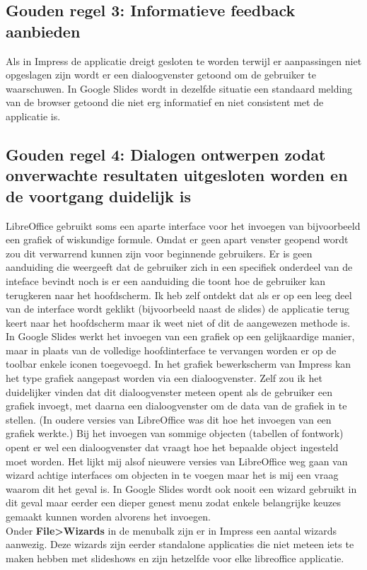 \documentclass[a4paper]{article}
\begin{document}
\subsection{Gouden regel 3: Informatieve feedback aanbieden}
Als in Impress de applicatie dreigt gesloten te worden terwijl er aanpassingen niet opgeslagen zijn wordt er een dialoogvenster getoond om de gebruiker te waarschuwen.
In Google Slides wordt in dezelfde situatie een standaard melding van de browser getoond die niet erg informatief en niet consistent met de applicatie is.
\subsection{Gouden regel 4: Dialogen ontwerpen zodat onverwachte resultaten uitgesloten worden en de voortgang duidelijk is}
LibreOffice gebruikt soms een aparte interface voor het invoegen van bijvoorbeeld een grafiek of wiskundige formule. Omdat er geen apart venster geopend wordt zou dit verwarrend kunnen zijn voor beginnende gebruikers.
Er is geen aanduiding die weergeeft dat de gebruiker zich in een specifiek onderdeel van de inteface bevindt noch is er een aanduiding die toont hoe de gebruiker kan terugkeren naar het hoofdscherm.
Ik heb zelf ontdekt dat als er op een leeg deel van de interface wordt geklikt (bijvoorbeeld naast de slides) de applicatie terug keert naar het hoofdscherm maar ik weet niet of dit de aangewezen methode is. \\
In Google Slides werkt het invoegen van een grafiek op een gelijkaardige manier, maar in plaats van de volledige hoofdinterface te vervangen worden er op de toolbar enkele iconen toegevoegd.
In het grafiek bewerkscherm van Impress kan het type grafiek aangepast worden via een dialoogvenster. Zelf zou ik het duidelijker vinden dat dit dialoogvenster meteen opent als de gebruiker een grafiek invoegt, met daarna een dialoogvenster om de data van de grafiek in te stellen. (In oudere versies van LibreOffice was dit hoe het invoegen van een grafiek werkte.)
Bij het invoegen van sommige objecten (tabellen of fontwork) opent er wel een dialoogvenster dat vraagt hoe het bepaalde object ingesteld moet worden. Het lijkt mij alsof nieuwere versies van LibreOffice weg gaan van wizard achtige interfaces om objecten in te voegen maar het is mij een vraag waarom dit het geval is.
In Google Slides wordt ook nooit een wizard gebruikt in dit geval maar eerder een dieper genest menu zodat enkele belangrijke keuzes gemaakt kunnen worden alvorens het invoegen.\\
Onder \textbf{File\textgreater Wizards} in de menubalk zijn er in Impress een aantal wizards aanwezig. Deze wizards zijn eerder standalone applicaties die niet meteen iets te maken hebben met slideshows en zijn hetzelfde voor elke libreoffice applicatie.
\end{document}

